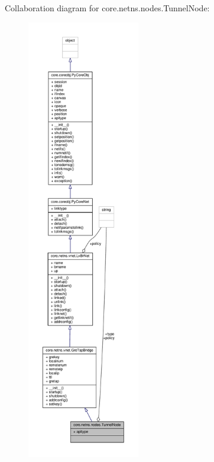 Collaboration diagram for core.\+netns.\+nodes.\+Tunnel\+Node\+:
\nopagebreak
\begin{figure}[H]
\begin{center}
\leavevmode
\includegraphics[height=550pt]{classcore_1_1netns_1_1nodes_1_1_tunnel_node__coll__graph}
\end{center}
\end{figure}
